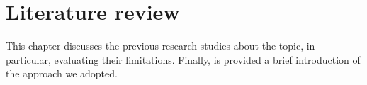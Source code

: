\chapter{Literature review}
\label{chap:stateoftheart}
This chapter discusses the previous research studies about the topic, in particular, 
evaluating their limitations. Finally, is provided a brief introduction of the 
approach we adopted.



